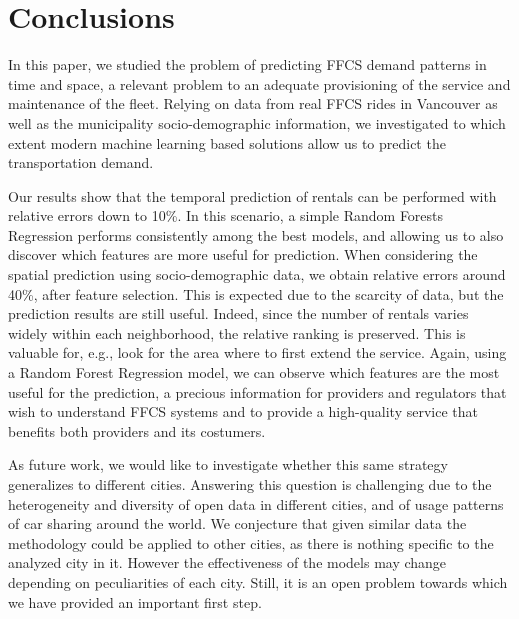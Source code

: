 \section{Conclusions}
\label{sec:conclu}

In this paper, we studied the problem of predicting FFCS demand patterns in time and space, a relevant problem to an adequate provisioning of the service and maintenance of the fleet. 
Relying on data from real FFCS rides in Vancouver as well as the municipality socio-demographic information, we investigated to which extent modern machine learning based solutions allow us to predict the transportation demand.

Our results show that the temporal prediction of rentals can be performed with relative errors down to 10\%. In this scenario, a simple Random Forests Regression performs consistently among the best models, and allowing us to also discover which features are more useful for prediction. 
When considering the spatial prediction using socio-demographic data, we obtain relative errors around 40\%, after feature selection. This is expected due to the scarcity of data, but the prediction results are still useful. Indeed, since the number of rentals varies widely within each neighborhood, the relative ranking is preserved. This is valuable for, e.g., look for the area where to first extend the service. Again, using a Random Forest Regression model, we can observe which features are the most useful for the prediction, a precious information for providers and regulators that wish to understand FFCS systems and to provide a high-quality service that benefits both providers and its costumers. 

As future work, we would like to investigate whether this same strategy generalizes to different cities. Answering this question is challenging due to the heterogeneity and diversity of open data in different cities, and of usage patterns of car sharing around the world. We conjecture that given similar data the methodology could be applied to other cities, as there is nothing specific to the analyzed city in it. However the effectiveness of the models may change depending on peculiarities of each city. Still, it is an open problem towards which we have provided an important first step.

